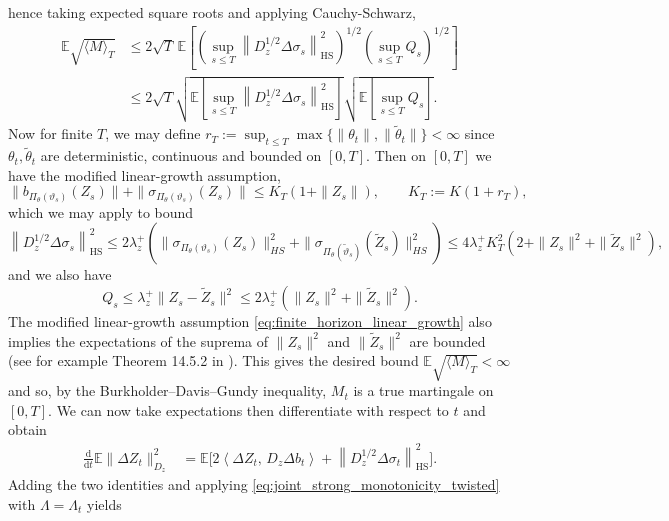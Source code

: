 hence taking expected square roots and applying Cauchy-Schwarz,
\begin{align*}
    \mathbb{E}\sqrt{\langle M\rangle_T}&\le 2\sqrt{T}\,\mathbb{E}\left[\left(\sup_{s\le T}\left\|D^{1/2}_z\Delta\sigma_s\right\|^2_{\mathrm{HS}}\right)^{1/2}\left(\sup_{s\le T} Q_s\right)^{1/2}\right]\\
    &\le 2\sqrt{T}\sqrt{\mathbb{E}\left[\sup_{s\le T}\left\|D^{1/2}_z\Delta\sigma_s\right\|^2_{\mathrm{HS}}\right]}\sqrt{\mathbb{E}\left[\sup_{s\le T} Q_s\right]}.
\end{align*}
Now for finite $T$, we may define $r_T:=\sup_{t\le T}\max\{\|\theta_t\|,\|\tilde\theta_t\|\}<\infty$ since $\theta_t,\tilde\theta_t$ are deterministic, continuous and bounded on $[0,T]$. Then on $[0,T]$ we have the modified linear-growth assumption,
\begin{equation}\label{eq:finite_horizon_linear_growth}
    \|b_{\Pi_{\theta}(\vartheta_s)}(Z_s)\|+\|\sigma_{\Pi_{\theta}(\vartheta_s)}(Z_s)\|\le K_T(1+\|Z_s\|),\qquad K_T:=K(1+r_T),
\end{equation}
which we may apply to bound
\begin{equation*}
    \left\|D^{1/2}_z\Delta\sigma_s\right\|^2_{\mathrm{HS}}\le 2\lambda^+_z\left(\|\sigma_{\Pi_\theta(\vartheta_s)}(Z_s)\|^2_{HS}+\|\sigma_{\Pi_\theta(\tilde\vartheta_s)}(\tilde Z_s)\|^2_{HS}\right)\le 4\lambda^+_z K_T^2\left(2+\|Z_s\|^2+\|\tilde Z_s\|^2\right),
\end{equation*}
and we also have
\begin{equation*}
    Q_s\le \lambda^+_z\|Z_s-\tilde Z_s\|^2\le 2\lambda_z^+\left(\|Z_s\|^2+\|\tilde Z_s\|^2\right).
\end{equation*}
The modified linear-growth assumption \eqref{eq:finite_horizon_linear_growth} also implies the expectations of the suprema of $\|Z_s\|^2$ and $\|\tilde Z_s\|^2$ are bounded (see for example Theorem 14.5.2 in \citet{Pascucci2024}). This gives the desired bound $\mathbb{E}\sqrt{\langle M\rangle_T}<\infty$ and so, by the Burkholder–Davis–Gundy inequality, $M_t$ is a true martingale on $[0,T]$. We can now take expectations then differentiate with respect to $t$ and obtain
\begin{align*}
    \frac{\mathrm d}{\mathrm dt}
    \mathbb E\|\Delta Z_t\|_{D_z}^2
    &=
    \mathbb E\Big[
    2\left\langle \Delta Z_t,\,
   D_z\Delta b_t
    \right\rangle+
    \left\|D_z^{1/2}\Delta\sigma_t\right\|_{\mathrm{HS}}^2
    \Big].
\end{align*}
Adding the two identities and applying \eqref{eq:joint_strong_monotonicity_twisted} with \(\Lambda=\Lambda_t\) yields

